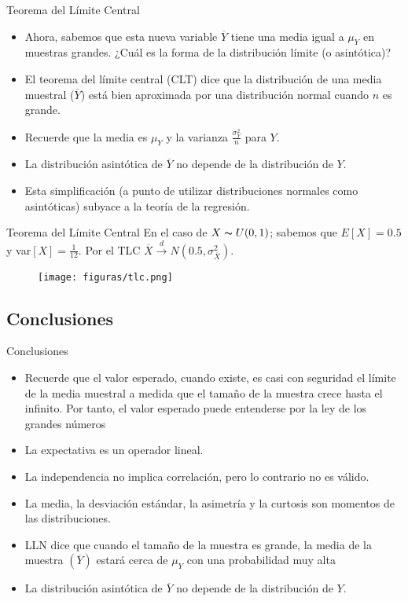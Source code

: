 \begin{frame}{Teorema del Límite Central}
	\begin{itemize}
		\item Ahora, sabemos que esta nueva variable $\overline{Y}$ tiene una media igual a $\mu_{Y}$ en muestras grandes. ¿Cuál es la forma de la distribución límite (o asintótica)?
		\item El teorema del límite central (CLT) dice que la distribución de una media muestral ($\overline{Y}$) está bien aproximada por una distribución normal cuando $n$ es grande.
		\item Recuerde que la media es $\mu_{Y}$ y la varianza $\frac{\sigma_{Y}^{2}}{n}$ para $Y$.
		\item La distribución asintótica de $\overline{Y}$ no depende de la distribución de $Y$.
		\item Esta simplificación (a punto de utilizar distribuciones normales como asintóticas) subyace a la teoría de la regresión.
	\end{itemize}
\end{frame}
\begin{frame}{Teorema del Límite Central}
	En el caso de $X \thicksim U(0,1)$; sabemos que $E[X]=0.5$ y var$[X]=\frac{1}{12}$. Por el TLC $\overline{X} \xrightarrow{d} N(0.5, \sigma_{\overline{X}}^{2})$.
		\begin{figure}
			\centering
			\texttt{[image: figuras/tlc.png]}
		\end{figure}
\end{frame}

\subsection{Conclusiones}
\begin{frame}{Conclusiones}
	\begin{itemize}
		\item Recuerde que el valor esperado, cuando existe, es casi con seguridad el límite de la media muestral a medida que el tamaño de la muestra crece hasta el infinito. Por tanto, el valor esperado puede entenderse por la ley de los grandes números
		\item La expectativa es un operador lineal.
		\item La independencia no implica correlación, pero lo contrario no es válido.
		\item La media, la desviación estándar, la asimetría y la curtosis son momentos de las distribuciones.
		\item LLN dice que cuando el tamaño de la muestra es grande, la media de la muestra $(\overline{Y})$ estará cerca de $\mu_{Y}$ con una probabilidad muy alta
		\item La distribución asintótica de $\overline{Y}$ no depende de la distribución de $Y$.
	\end{itemize}
\end{frame}